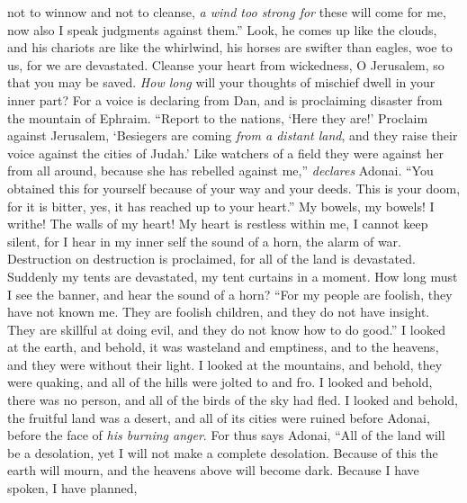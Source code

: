 \begin{biblechapter}
not to winnow and not to cleanse,
\verse \textit{a wind too strong for} these will come for me, 
now also I speak judgments against them.”
\verse Look, he comes up like the clouds, 
and his chariots are like the whirlwind, 
his horses are swifter than eagles, 
woe to us, for we are devastated.
\verse Cleanse your heart from wickedness, O Jerusalem, 
so that you may be saved. 
\textit{How long} will your thoughts of mischief 
dwell in your inner part?
\verse For a voice is declaring from Dan, 
and is proclaiming disaster from the mountain of Ephraim.
\verse “Report to the nations, ‘Here they are!’ 
Proclaim against Jerusalem, 
‘Besiegers are coming \textit{from a distant land}, 
and they raise their voice against the cities of Judah.’
\verse Like watchers of a field they were against her from all around, 
because she has rebelled against me,” \textit{declares} Adonai.
\verse “You obtained this for yourself 
because of your way and your deeds. 
This is your doom, for it is bitter, 
yes, it has reached up to your heart.”
\verse My bowels, my bowels! I writhe! 
The walls of my heart! 
My heart is restless within me, I cannot keep silent, 
for I hear in my inner self the sound of a horn, the alarm of war.
\verse Destruction on destruction is proclaimed, 
for all of the land is devastated. 
Suddenly my tents are devastated, 
my tent curtains in a moment.
\verse How long must I see the banner, 
and hear the sound of a horn?
\verse “For my people are foolish, 
they have not known me. 
They are foolish children, 
and they do not have insight. 
They are skillful at doing evil, 
and they do not know how to do good.”
\verse I looked at the earth, and behold, it was wasteland and emptiness, 
and to the heavens, and they were without their light.
\verse I looked at the mountains, and behold, they were quaking, 
and all of the hills were jolted to and fro.
\verse I looked and behold, there was no person, 
and all of the birds of the sky had fled.
\verse I looked and behold, the fruitful land was a desert, 
and all of its cities were ruined before Adonai, 
before the face of \textit{his burning anger}.
\verse For thus says Adonai, “All of the land will be a desolation, 
yet I will not make a complete desolation.
\verse Because of this the earth will mourn, 
and the heavens above will become dark. 
Because I have spoken, I have planned, 

\end{biblechapter}
